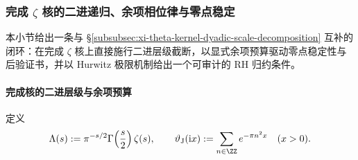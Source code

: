 \subsubsection{完成 \texorpdfstring{$\zeta$}{zeta} 核的二进递归、余项相位律与零点稳定}\label{subsubsec:xi-completed-zeta-dyadic-zero-stability}
本小节给出一条与 \S\ref{subsubsec:xi-theta-kernel-dyadic-scale-decomposition} 互补的闭环：在完成 \(\zeta\) 核上直接施行二进层级截断，以显式余项预算驱动零点稳定性与后验证书，并以 Hurwitz 极限机制给出一个可审计的 RH 归约条件。

\paragraph{完成核的二进层级与余项预算}
定义
\begin{equation}\label{eq:xi-completed-zeta-lambda-def}
\Lambda(s):=\pi^{-s/2}\Gamma\!\left(\frac{s}{2}\right)\zeta(s),
\qquad
\vartheta_{\mathrm J}(\mathrm{i}x):=\sum_{n\in\ZZ}e^{-\pi n^2x}\quad(x>0).
\end{equation}

